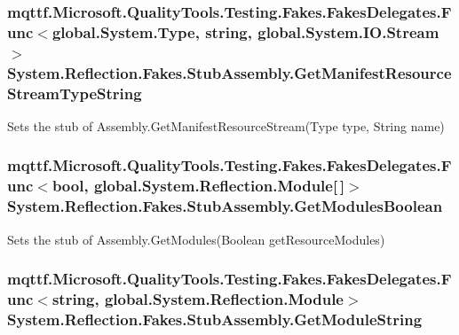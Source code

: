 \hypertarget{class_system_1_1_reflection_1_1_fakes_1_1_stub_assembly_a9002db3163c6b0bcfa1e6e4b57f8f80c}{
\subsubsection[{Get\-Manifest\-Resource\-Stream\-Type\-String}]{\setlength{\rightskip}{0pt plus 5cm}mqttf.\-Microsoft.\-Quality\-Tools.\-Testing.\-Fakes.\-Fakes\-Delegates.\-Func$<$global.\-System.\-Type, string, global.\-System.\-I\-O.\-Stream$>$ System.\-Reflection.\-Fakes.\-Stub\-Assembly.\-Get\-Manifest\-Resource\-Stream\-Type\-String}}\label{class_system_1_1_reflection_1_1_fakes_1_1_stub_assembly_a9002db3163c6b0bcfa1e6e4b57f8f80c}


Sets the stub of Assembly.\-Get\-Manifest\-Resource\-Stream(\-Type type, String name)

\hypertarget{class_system_1_1_reflection_1_1_fakes_1_1_stub_assembly_ab76f77a37bfe5a7339a8db37e18f7764}{
\subsubsection[{Get\-Modules\-Boolean}]{\setlength{\rightskip}{0pt plus 5cm}mqttf.\-Microsoft.\-Quality\-Tools.\-Testing.\-Fakes.\-Fakes\-Delegates.\-Func$<$bool, global.\-System.\-Reflection.\-Module\mbox{[}$\,$\mbox{]}$>$ System.\-Reflection.\-Fakes.\-Stub\-Assembly.\-Get\-Modules\-Boolean}}\label{class_system_1_1_reflection_1_1_fakes_1_1_stub_assembly_ab76f77a37bfe5a7339a8db37e18f7764}


Sets the stub of Assembly.\-Get\-Modules(\-Boolean get\-Resource\-Modules)

\hypertarget{class_system_1_1_reflection_1_1_fakes_1_1_stub_assembly_a7c04d2f2a63fef0e36f07742b33fb11f}{
\subsubsection[{Get\-Module\-String}]{\setlength{\rightskip}{0pt plus 5cm}mqttf.\-Microsoft.\-Quality\-Tools.\-Testing.\-Fakes.\-Fakes\-Delegates.\-Func$<$string, global.\-System.\-Reflection.\-Module$>$ System.\-Reflection.\-Fakes.\-Stub\-Assembly.\-Get\-Module\-String}}\label{class_system_1_1_reflection_1_1_fakes_1_1_stub_assembly_a7c04d2f2a63fef0e36f07742b33fb11f}


